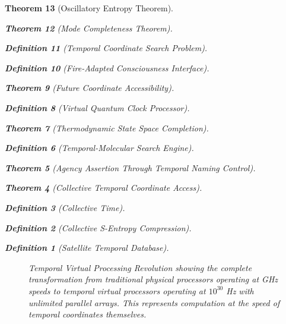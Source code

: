 \documentclass[12pt,a4paper]{article}
\newtheorem{theorem}{Theorem}[section]
\newtheorem{definition}[theorem]{Definition}
\begin{document}
\begin{theorem}[Oscillatory Entropy Theorem]
\begin{theorem}[Mode Completeness Theorem]
\begin{enumerate}
\begin{definition}[Temporal Coordinate Search Problem]
\begin{algorithm}
\begin{definition}[Fire-Adapted Consciousness Interface]
\begin{theorem}[Future Coordinate Accessibility]
\begin{definition}[Virtual Quantum Clock Processor]
\begin{itemize}
\begin{itemize}
\begin{theorem}[Thermodynamic State Space Completion]
\begin{definition}[Temporal-Molecular Search Engine]
\begin{theorem}[Agency Assertion Through Temporal Naming Control]
\begin{remark}
\begin{theorem}[Collective Temporal Coordinate Access]
\begin{definition}[Collective Time]
\begin{definition}[Collective S-Entropy Compression]
\begin{definition}[Satellite Temporal Database]
\begin{algorithm}
\begin{table}[h]
{\begin{figure}[h]
\caption{Temporal Virtual Processing Revolution showing the complete transformation from traditional physical processors operating at GHz speeds to temporal virtual processors operating at $10^{30}$ Hz with unlimited parallel arrays. This represents computation at the speed of temporal coordinates themselves.}
\label{fig:temporal_virtual_processing_revolution}
\end{figure}

\begin{figure}[h]
\centering
\begin{tikzpicture}[
    node distance=2cm,
    proc/.style={rectangle, draw, text width=2.5cm, text centered, minimum height=1.5cm},
    arrow/.style={thick,->,>=stealth}
]


\end{tikzpicture}
\end{figure}}
\end{table}
\end{algorithm}
\end{definition}
\end{definition}
\end{definition}
\end{theorem}
\end{remark}
\end{theorem}
\end{definition}
\end{theorem}
\end{itemize}
\end{itemize}
\end{definition}
\end{theorem}
\end{definition}
\end{algorithm}
\end{definition}
\end{enumerate}
\end{theorem}
\end{theorem}
\end{document}
